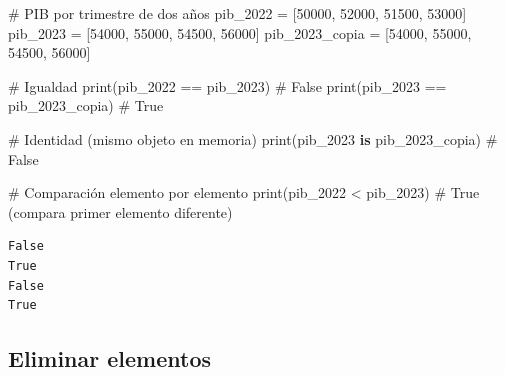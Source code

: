 \documentclass[
  doc,
  floatsintext,
  longtable,
  a4paper,
  nolmodern,
  notxfonts,
  notimes,
  12pt,
  colorlinks=true,linkcolor=blue,citecolor=blue,urlcolor=blue]{apa7}
\newenvironment{Shaded}{\begin{snugshade}}{\end{snugshade}}
\newcommand{\BuiltInTok}[1]{\textcolor[rgb]{0.00,0.23,0.31}{#1}}
\newcommand{\CommentTok}[1]{\textcolor[rgb]{0.37,0.37,0.37}{#1}}
\newcommand{\DecValTok}[1]{\textcolor[rgb]{0.68,0.00,0.00}{#1}}
\newcommand{\KeywordTok}[1]{\textcolor[rgb]{0.00,0.23,0.31}{\textbf{#1}}}
\newcommand{\NormalTok}[1]{\textcolor[rgb]{0.00,0.23,0.31}{#1}}
\newcommand{\OperatorTok}[1]{\textcolor[rgb]{0.37,0.37,0.37}{#1}}
\begin{document}
\begin{Shaded}
\begin{Highlighting}[]
\CommentTok{\# PIB por trimestre de dos años}
\NormalTok{pib\_2022 }\OperatorTok{=}\NormalTok{ [}\DecValTok{50000}\NormalTok{, }\DecValTok{52000}\NormalTok{, }\DecValTok{51500}\NormalTok{, }\DecValTok{53000}\NormalTok{]}
\NormalTok{pib\_2023 }\OperatorTok{=}\NormalTok{ [}\DecValTok{54000}\NormalTok{, }\DecValTok{55000}\NormalTok{, }\DecValTok{54500}\NormalTok{, }\DecValTok{56000}\NormalTok{]}
\NormalTok{pib\_2023\_copia }\OperatorTok{=}\NormalTok{ [}\DecValTok{54000}\NormalTok{, }\DecValTok{55000}\NormalTok{, }\DecValTok{54500}\NormalTok{, }\DecValTok{56000}\NormalTok{]}

\CommentTok{\# Igualdad}
\BuiltInTok{print}\NormalTok{(pib\_2022 }\OperatorTok{==}\NormalTok{ pib\_2023)        }\CommentTok{\# False}
\BuiltInTok{print}\NormalTok{(pib\_2023 }\OperatorTok{==}\NormalTok{ pib\_2023\_copia)  }\CommentTok{\# True}

\CommentTok{\# Identidad (mismo objeto en memoria)}
\BuiltInTok{print}\NormalTok{(pib\_2023 }\KeywordTok{is}\NormalTok{ pib\_2023\_copia)  }\CommentTok{\# False}

\CommentTok{\# Comparación elemento por elemento}
\BuiltInTok{print}\NormalTok{(pib\_2022 }\OperatorTok{\textless{}}\NormalTok{ pib\_2023)  }\CommentTok{\# True (compara primer elemento diferente)}
\end{Highlighting}
\end{Shaded}

\begin{verbatim}
False
True
False
True
\end{verbatim}

\subsection{Eliminar elementos}\label{eliminar-elementos}
\end{document}
